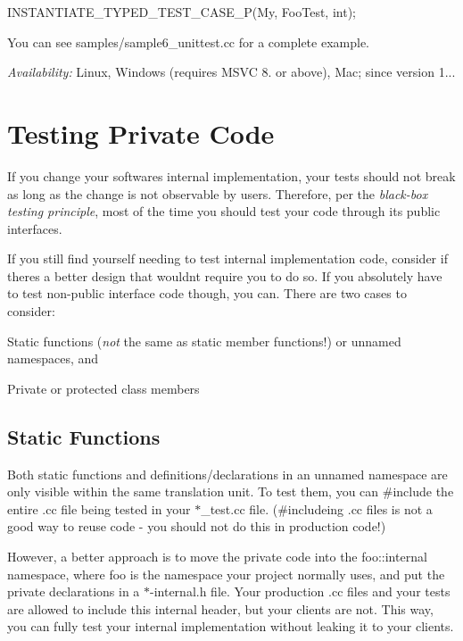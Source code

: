 \begin{DoxyCode}
INSTANTIATE\_TYPED\_TEST\_CASE\_P(My, FooTest, int);
\end{DoxyCode}


You can see {\ttfamily samples/sample6\+\_\+unittest.\+cc} for a complete example.

{\itshape Availability\+:} Linux, Windows (requires M\+S\+VC 8. or above), Mac; since version 1...

\section*{Testing Private Code}

If you change your software\textquotesingle{}s internal implementation, your tests should not break as long as the change is not observable by users. Therefore, per the {\itshape black-\/box testing principle}, most of the time you should test your code through its public interfaces.

If you still find yourself needing to test internal implementation code, consider if there\textquotesingle{}s a better design that wouldn\textquotesingle{}t require you to do so. If you absolutely have to test non-\/public interface code though, you can. There are two cases to consider\+:


\begin{DoxyItemize}
\item Static functions ({\itshape not} the same as static member functions!) or unnamed namespaces, and
\item Private or protected class members
\end{DoxyItemize}

\subsection*{Static Functions}

Both static functions and definitions/declarations in an unnamed namespace are only visible within the same translation unit. To test them, you can {\ttfamily \#include} the entire {\ttfamily .cc} file being tested in your {\ttfamily $\ast$\+\_\+test.cc} file. ({\ttfamily \#include}ing {\ttfamily .cc} files is not a good way to reuse code -\/ you should not do this in production code!)

However, a better approach is to move the private code into the {\ttfamily foo\+::internal} namespace, where {\ttfamily foo} is the namespace your project normally uses, and put the private declarations in a {\ttfamily $\ast$-\/internal.h} file. Your production {\ttfamily .cc} files and your tests are allowed to include this internal header, but your clients are not. This way, you can fully test your internal implementation without leaking it to your clients.

